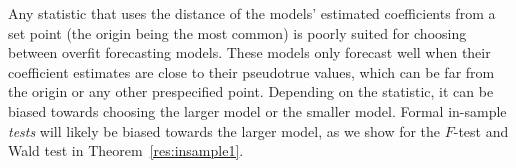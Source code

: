 Any statistic that uses the distance of the models' estimated
coefficients from a set point (the origin being the most common) is
poorly suited for choosing between overfit forecasting models. These
models only forecast well when their coefficient estimates are close
to their pseudotrue values, which can be far from the origin or any
other prespecified
point. Depending on the statistic, it can be biased towards choosing
the larger model or the smaller model. Formal in-sample \emph{tests}
will likely be biased towards the larger model, as we show for the
$F$-test and Wald test in Theorem~\ref{res:insample1}.

